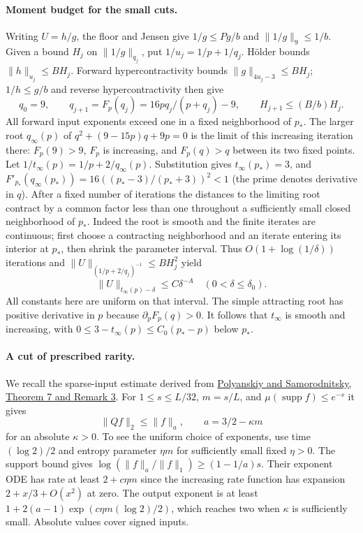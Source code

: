 \paragraph{Moment budget for the small cuts.}
Writing $U=h/g$, the floor and Jensen give $1/g\le Pg/b$ and
$\|1/g\|_9\le1/b$. Given a bound $H_j$ on $\|1/g\|_{q_j}$,
put $1/u_j=1/p+1/q_j$. H\"older bounds $\|h\|_{u_j}\le B H_j$.
Forward hypercontractivity bounds $\|g\|_{4u_j-3}\le B H_j$;
$1/h\le g/b$ and reverse hypercontractivity then give
\[
 q_0=9,\qquad q_{j+1}=F_p(q_j)=16p q_j/(p+q_j)-9,\qquad
 H_{j+1}\le (B/b)H_j .
\]
All forward input exponents exceed one in a fixed neighborhood of $p_*$.
The larger root $q_\infty(p)$ of $q^2+(9-15p)q+9p=0$ is the limit of
this increasing iteration there: $F_p(9)>9$, $F_p$ is increasing,
and $F_p(q)>q$ between its two fixed points.
Let $1/t_\infty(p)=1/p+2/q_\infty(p)$. Substitution gives
$t_\infty(p_*)=3$, and
$F'_{p_*}(q_\infty(p_*))=16((p_*-3)/(p_*+3))^2<1$
(the prime denotes derivative in $q$).
After a fixed number of iterations the distances to the limiting root
contract by a common factor less than one throughout a sufficiently small
closed neighborhood of $p_*$. Indeed the root is smooth and the finite
iterates are continuous; first choose a contracting neighborhood and an
iterate entering its interior at $p_*$, then shrink the parameter interval.
Thus $O(1+\log(1/\delta))$ iterations and
$\|U\|_{(1/p+2/q_j)^{-1}}\le BH_j^2$ yield
\[
 \|U\|_{t_\infty(p)-\delta}\le C\delta^{-A}
 \quad(0<\delta\le\delta_0).                            \tag{G4}
\]
All constants here are uniform on that interval. The simple attracting
root has positive derivative in $p$ because $\partial_p F_p(q)>0$.
It follows that $t_\infty$ is smooth and increasing, with
$0\le3-t_\infty(p)\le C_0(p_*-p)$ below $p_*$.

\paragraph{A cut of prescribed rarity.}
We recall the sparse-input estimate derived from
\href{https://arxiv.org/pdf/1606.07491}{Polyanskiy and Samorodnitsky,
Theorem 7 and Remark 3}. For $1\le s\le L/32$, $m=s/L$,
and $\mu(\operatorname{supp}f)\le e^{-s}$ it gives
\[
 \|Q f\|_2\le\|f\|_{a},\qquad a=3/2-\kappa m
\]
for an absolute $\kappa>0$. To see the uniform choice of exponents,
use time $(\log2)/2$ and entropy parameter $\eta m$ for sufficiently
small fixed $\eta>0$. The support bound gives
$\log(\|f\|_a/\|f\|_1)\ge(1-1/a)s$. Their exponent ODE has rate
at least $2+c\eta m$ since the increasing rate function has expansion
$2+x/3+O(x^2)$ at zero. The output exponent is at least
$1+2(a-1)\exp(c\eta m(\log2)/2)$, which reaches two when $\kappa$
is sufficiently small. Absolute values cover signed inputs.

